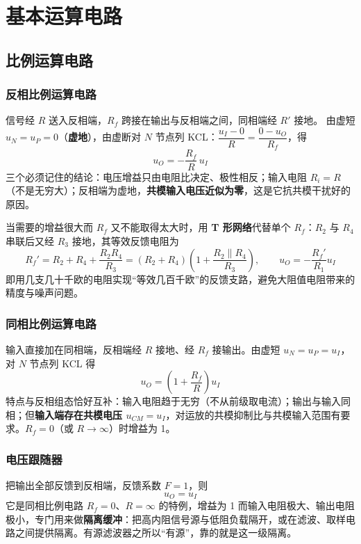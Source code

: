 \section{基本运算电路}
\subsection{比例运算电路}
\subsubsection{反相比例运算电路}
信号经 $R$ 送入反相端，$R_f$ 跨接在输出与反相端之间，同相端经 $R'$ 接地。
由虚短 $u_N=u_P=0$（\textbf{虚地}），由虚断对 $N$ 节点列 KCL：$\dfrac{u_I-0}{R}=\dfrac{0-u_O}{R_f}$，得
\begin{equation}
u_O = -\frac{R_f}{R}\,u_I
\end{equation}
三个必须记住的结论：电压增益只由电阻比决定、极性相反；输入电阻 $R_i=R$（不是无穷大）；反相端为虚地，\textbf{共模输入电压近似为零}，这是它抗共模干扰好的原因。

当需要的增益很大而 $R_f$ 又不能取得太大时，用 \textbf{T 形网络}代替单个 $R_f$：$R_2$ 与 $R_4$ 串联后又经 $R_3$ 接地，其等效反馈电阻为
\begin{equation}
R_f' = R_2+R_4+\frac{R_2R_4}{R_3}
= (R_2+R_4)\left(1+\frac{R_2\parallel R_4}{R_3}\right),
\qquad u_O = -\frac{R_f'}{R_1}u_I
\end{equation}
即用几支几十千欧的电阻实现“等效几百千欧”的反馈支路，避免大阻值电阻带来的精度与噪声问题。

\subsubsection{同相比例运算电路}
输入直接加在同相端，反相端经 $R$ 接地、经 $R_f$ 接输出。由虚短 $u_N=u_P=u_I$，对 $N$ 节点列 KCL 得
\begin{equation}
u_O = \left(1+\frac{R_f}{R}\right)u_I
\end{equation}
特点与反相组态恰好互补：输入电阻趋于无穷（不从前级取电流）；输出与输入同相；但\textbf{输入端存在共模电压 $u_{CM}=u_I$}，对运放的共模抑制比与共模输入范围有要求。$R_f=0$（或 $R\to\infty$）时增益为 1。

\subsubsection{电压跟随器}
把输出全部反馈到反相端，反馈系数 $F=1$，则
\begin{equation}
u_O = u_I
\end{equation}
它是同相比例电路 $R_f=0$、$R=\infty$ 的特例，增益为 1 而输入电阻极大、输出电阻极小，专门用来做\textbf{隔离缓冲}：把高内阻信号源与低阻负载隔开，或在滤波、取样电路之间提供隔离。有源滤波器之所以“有源”，靠的就是这一级隔离。

